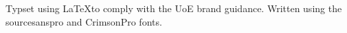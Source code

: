 \newpage
{}
\vspace*{\fill}

\begin{center}
Typset using \LaTeX to comply with the UoE brand guidance. Written using the sourcesanspro and \textrm{CrimsonPro} fonts.
\end{center}
\vspace*{\fill}
\vspace{1em}

